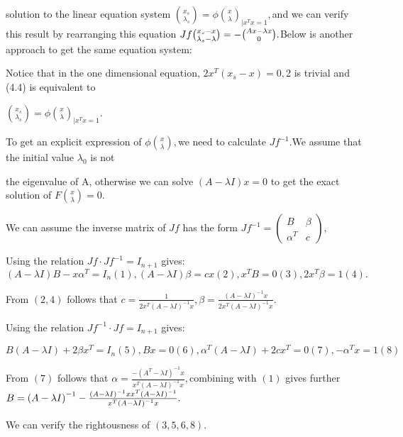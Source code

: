 \documentclass{article}
\begin{document}
solution to the linear equation system $\binom{x_{s}}{\lambda _{s}}=\phi 
\binom{x}{\lambda }_{|x^{T}x=1},$and we can verify this result by
rearranging this equation $Jf\binom{x_{s}-x}{\lambda _{s}-\lambda }=-\binom{%
Ax-\lambda x}{0}.$Below is another approach to get the same equation system:


Notice that in the one dimensional equation, $2x^{T}\left( x_{s}-x\right) =0,
$2 is trivial and (4.4) is equivalent to

$\binom{x_{s}}{\lambda _{s}}=\phi \binom{x}{\lambda }_{|x^{T}x=1}.$

To get an explicit expression of $\phi \binom{x}{\lambda },$we need to
calculate $Jf^{-1}.$We assume that the initial value $\lambda _{0}$ is not 

the eigenvalue of A, otherwise we can solve $\left( A-\lambda I\right) x=0$
to get the exact solution of  $F\binom{x}{\lambda }=0.$

We can assume the inverse matrix of $Jf$ has the form $Jf^{-1}=\left( 
\begin{array}{cc}
B & \beta  \\ 
\alpha ^{T} & c%
\end{array}%
\right) ,$

\bigskip Using the relation  $Jf\cdot Jf^{-1}=I_{n+1}$ gives: $\left(
A-\lambda I\right) B-x\alpha ^{T}=I_{n}\left( 1\right) ,\left( A-\lambda
I\right) \beta =cx\left( 2\right) ,x^{T}B=0\left( 3\right) ,2x^{T}\beta
=1\left( 4\right) .$

From $\left( 2,4\right) $ follows that $c=\frac{1}{2x^{T}\left( A-\lambda
I\right) ^{-1}x},\beta =\frac{\left( A-\lambda I\right) ^{-1}x}{2x^{T}\left(
A-\lambda I\right) ^{-1}x}.$

Using the relation $Jf^{-1}\cdot Jf=I_{n+1}$ gives: 

$B\left( A-\lambda I\right) +2\beta x^{T}=I_{n}\left( 5\right) ,Bx=0\left(
6\right) ,\alpha ^{T}\left( A-\lambda I\right) +2cx^{T}=0\left( 7\right)
,-\alpha ^{T}x=1\left( 8\right) $

From $\left( 7\right) $ follows that $\alpha =\frac{-\left( A^{T}-\lambda
I\right) ^{-1}x}{x^{T}\left( A-\lambda I\right) ^{-1}x},$combining with $%
\left( 1\right) $ gives further $B=\left( A-\lambda I\right) ^{-1}-\frac{%
\left( A-\lambda I\right) ^{-1}xx^{T}\left( A-\lambda I\right) ^{-1}}{%
x^{T}\left( A-\lambda I\right) ^{-1}x}.$

We can verify the rightousness of $\left( 3,5,6,8\right) .$
\end{document}
